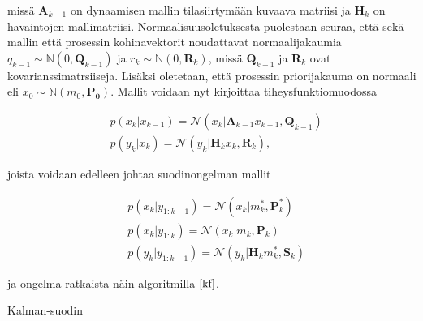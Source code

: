 \documentclass[
  12pt,
  a4paper, twoside]{book}
\begin{document}
missä \(\mathbf{A}_{k-1}\) on dynaamisen mallin tilasiirtymään kuvaava matriisi ja \(\mathbf{H}_k\) on havaintojen mallimatriisi. Normaalisuusoletuksesta puolestaan seuraa, että sekä mallin että prosessin kohinavektorit noudattavat normaalijakaumia \(q_{k-1} \sim \mathbb{N}(0, \mathbf{Q}_{k-1})\) ja \(r_k \sim \mathbb{N}(0, \mathbf{R}_k)\), missä \(\mathbf{Q}_{k-1}\) ja \(\mathbf{R}_k\) ovat kovarianssimatrsiiseja. Lisäksi oletetaan, että prosessin priorijakauma on normaali eli \(x_0 \sim \mathbb{N}(m_0, \mathbf{P_0})\). Mallit voidaan nyt kirjoittaa tiheysfunktiomuodossa

\begin{align}
&\label{kalman-malli-pdf1}p(x_k|x_{k-1})=\mathcal{N}(x_k|\mathbf{A}_{k-1}x_{k-1},\mathbf{Q}_{k-1})\\
&\label{kalman-malli-pdf2}p(y_k|x_k)=\mathcal{N}(y_k|\mathbf{H}_{k}x_{k},\mathbf{R}_{k}),
\end{align}

joista voidaan edelleen johtaa suodinongelman mallit

\begin{align}
&\label{kalman-malli-suodin1}p(x_k|y_{1:k-1})=\mathcal{N}(x_k|m_k^* ,\mathbf{P}_k^*)\\
&\label{kalman-malli-suodin2}p(x_k|y_{1:k})=\mathcal{N}(x_k|m_k ,\mathbf{P}_k)\\
&\label{kalman-malli-suodin3}p(y_k|y_{1:k-1})=\mathcal{N}(y_k|\mathbf{H}_k m_k^* ,\mathbf{S}_k)
\end{align}

ja ongelma ratkaista näin algoritmilla \(\ref{kf}\).

\begin{algorithm}[H]
\label{kf}
\DontPrintSemicolon
\SetAlgoShortEnd
{}
\caption{Kalman-suodin}
\end{algorithm}
\end{document}
